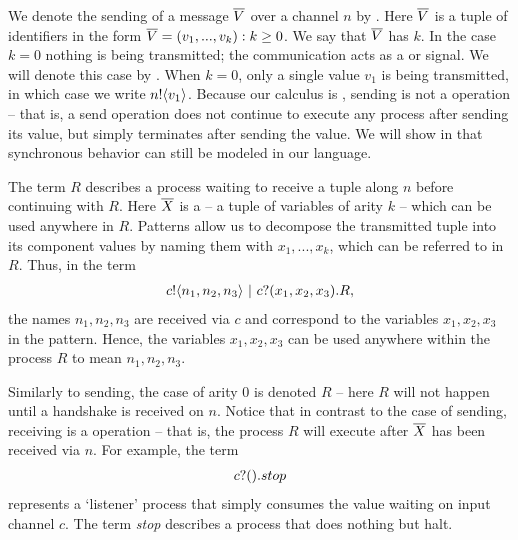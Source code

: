 	We denote the sending of a message $\overline{V}$ over a channel $n$ by .  
Here $\overline{V}$ is a tuple of identifiers in the form $\overline{V}=(v_1,...,v_k):k\geq 0$.  
We say that $\overline{V}$ has  $k$.  
In the case $k=0$ nothing is being transmitted; the communication acts as a  or signal.  
We will denote this case by .  
When $k=0$, only a single value $v_1$ is being transmitted, in which case we write ${n}!\langle{v_1}\rangle$.  
Because our calculus is , sending is not a  operation -- that is, a send operation does not continue to execute any process after sending its value, but simply terminates after sending the value.  
We will show in  that synchronous behavior can still be modeled in our language.
	
	The term $R$ describes a process waiting to receive a tuple along $n$ before continuing with $R$.  
Here $\overline{X}$ is a  -- a tuple of variables of arity $k$ -- which can be used anywhere in $R$.  
Patterns allow us to decompose the transmitted tuple into its component values by naming them with $x_1,...,x_k$, which can be referred to in $R$.  
Thus, in the term
	\begin{align}
		{c}!\langle{n_1,n_2,n_3}\rangle \ |\  {c}?({x_1,x_2,x_3}). R,
	\end{align}
the names $n_1,n_2,n_3$ are received via $c$ and correspond to the variables $x_1,x_2,x_3$ in the pattern.  
 Hence, the variables $x_1,x_2,x_3$ can be used anywhere within the process $R$ to mean $n_1,n_2,n_3$.  


Similarly to sending, the case of arity 0 is denoted $R$ -- here $R$ will not happen until a handshake is received on $n$.  
Notice that in contrast to the case of sending, receiving is a  operation -- that is, the process $R$ will execute after $\overline{X}$ has been received via $n$.  
For example, the term
\begin{align}
	{c}?({}).stop
\end{align}
represents a `listener'	process that simply consumes the value waiting on input channel $c$.  
The term \emph{stop} describes a process that does nothing but halt.

